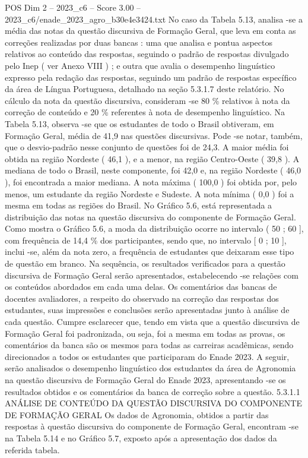 \begin{textsample}{POS Dim 2 – 2023\_c6 – Score 3.00 – 2023\_c6/enade\_2023\_agro\_b30e4e3424.txt}
No caso da Tabela 5.13, analisa -se a média das notas da questão discursiva de Formação Geral, que leva em conta as correções realizadas por duas bancas : uma que analisa e pontua aspectos relativos ao conteúdo das respostas, seguindo o padrão de respostas divulgado pelo Inep ( ver Anexo VIII ) ; e outra que avalia o desempenho linguístico expresso pela redação das respostas, seguindo um padrão de respostas específico da área de Língua Portuguesa, detalhado na seção 5.3.1.7 deste relatório.
No cálculo da nota da questão discursiva, consideram -se 80 \% relativos à nota da correção de conteúdo e 20 \% referentes à nota de desempenho linguístico.
Na Tabela 5.13, observa -se que os estudantes de todo o Brasil obtiveram, em Formação Geral, média de 41,9 nas questões discursivas.
Pode -se notar, também, que o desvio-padrão nesse conjunto de questões foi de 24,3.
A maior média foi obtida na região Nordeste ( 46,1 ), e a menor, na região Centro-Oeste ( 39,8 ).
A mediana de todo o Brasil, neste componente, foi 42,0 e, na região Nordeste ( 46,0 ), foi encontrada a maior mediana.
A nota máxima ( 100,0 ) foi obtida por, pelo menos, um estudante da região Nordeste e Sudeste.
A nota mínima ( 0,0 ) foi a mesma em todas as regiões do Brasil.
No Gráfico 5.6, está representada a distribuição das notas na questão discursiva do componente de Formação Geral.
Como mostra o Gráfico 5.6, a moda da distribuição ocorre no intervalo ( 50 ; 60 ], com frequência de 14,4 \% dos participantes, sendo que, no intervalo [ 0 ; 10 ], inclui -se, além da nota zero, a frequência de estudantes que deixaram esse tipo de questão em branco.
Na sequência, os resultados verificados para a questão discursiva de Formação Geral serão apresentados, estabelecendo -se relações com os conteúdos abordados em cada uma delas.
Os comentários das bancas de docentes avaliadores, a respeito do observado na correção das respostas dos estudantes, suas impressões e conclusões serão apresentadas junto à análise de cada questão.
Cumpre esclarecer que, tendo em vista que a questão discursiva de Formação Geral foi padronizada, ou seja, foi a mesma em todas as provas, os comentários da banca são os mesmos para todas as carreiras acadêmicas, sendo direcionados a todos os estudantes que participaram do Enade 2023.
A seguir, serão analisados o desempenho linguístico dos estudantes da área de Agronomia na questão discursiva de Formação Geral do Enade 2023, apresentando -se os resultados obtidos e os comentários da banca de correção sobre a questão. 5.3.1.1 ANÁLISE DE CONTEÚDO DA QUESTÃO DISCURSIVA DO COMPONENTE DE FORMAÇÃO GERAL Os dados de Agronomia, obtidos a partir das respostas à questão discursiva do componente de Formação Geral, encontram -se na Tabela 5.14 e no Gráfico 5.7, exposto após a apresentação dos dados da referida tabela.

\end{textsample}
